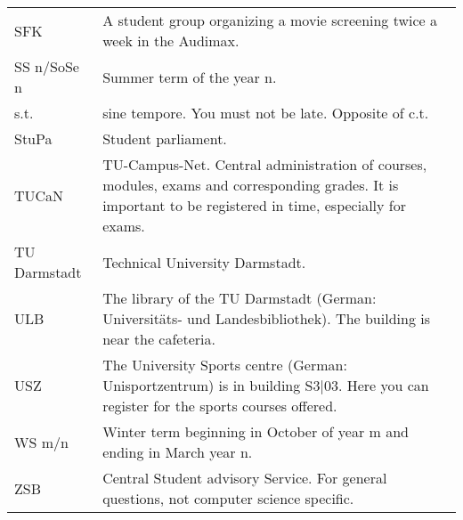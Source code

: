\begin{longtable}{p{20mm}p{85mm}}
    SFK          & A student group organizing a movie screening twice a week in the Audimax.                                                                                                                                                                                \\
    SS n/SoSe n  & Summer term of the year n.                                                                                                                                                                                                                               \\
    s.t.         & sine tempore. You must not be late. Opposite of c.t.                                                                                                                                                                                                     \\
    StuPa        & Student parliament.                                                                                                                                                                                                                                      \\
    TUCaN        & TU-Campus-Net. Central administration of courses, modules, exams and corresponding grades. It is important to be registered in time, especially for exams.                                                                                               \\
    TU Darmstadt & Technical University Darmstadt.                                                                                                                                                                                                                          \\
    ULB          & The library of the TU Darmstadt (German: Universitäts- und Landesbibliothek). The building is near the cafeteria.                                                                                                                                        \\
    USZ          & The University Sports centre (German: Unisportzentrum) is in building S3$|$03. Here you can register for the sports courses offered.                                                                                                                     \\
    WS m/n       & Winter term beginning in October of year m and ending in March year n.                                                                                                                                                                                   \\
    ZSB          & Central Student advisory Service. For general questions, not computer science specific.                                                                                                                                                                  \\
\end{longtable}
